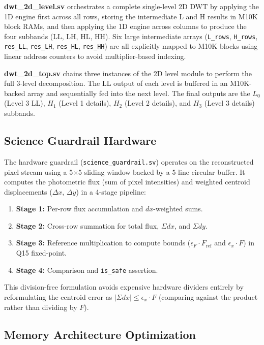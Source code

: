 \documentclass[conference]{IEEEtran}
\begin{document}
\textbf{dwt\_2d\_level.sv} orchestrates a complete single-level 2D DWT by applying the 1D engine first across all rows, storing the intermediate L and H results in M10K block RAMs, and then applying the 1D engine across columns to produce the four subbands (LL, LH, HL, HH). Six large intermediate arrays (\texttt{L\_rows}, \texttt{H\_rows}, \texttt{res\_LL}, \texttt{res\_LH}, \texttt{res\_HL}, \texttt{res\_HH}) are all explicitly mapped to M10K blocks using linear address counters to avoid multiplier-based indexing.

\textbf{dwt\_2d\_top.sv} chains three instances of the 2D level module to perform the full 3-level decomposition. The LL output of each level is buffered in an M10K-backed array and sequentially fed into the next level. The final outputs are the $L_0$ (Level 3 LL), $H_1$ (Level 1 details), $H_2$ (Level 2 details), and $H_3$ (Level 3 details) subbands.

\subsection{Science Guardrail Hardware}

The hardware guardrail (\texttt{science\_guardrail.sv}) operates on the reconstructed pixel stream using a 5$\times$5 sliding window backed by a 5-line circular buffer. It computes the photometric flux (sum of pixel intensities) and weighted centroid displacements ($\Delta x$, $\Delta y$) in a 4-stage pipeline:

\begin{enumerate}
    \item \textbf{Stage 1:} Per-row flux accumulation and $dx$-weighted sums.
    \item \textbf{Stage 2:} Cross-row summation for total flux, $\Sigma dx$, and $\Sigma dy$.
    \item \textbf{Stage 3:} Reference multiplication to compute bounds ($\epsilon_F \cdot F_{\text{ref}}$ and $\epsilon_x \cdot F$) in Q15 fixed-point.
    \item \textbf{Stage 4:} Comparison and \texttt{is\_safe} assertion.
\end{enumerate}

This division-free formulation avoids expensive hardware dividers entirely by reformulating the centroid error as $|\Sigma dx| \leq \epsilon_x \cdot F$ (comparing against the product rather than dividing by $F$).

\subsection{Memory Architecture Optimization}
\end{document}
